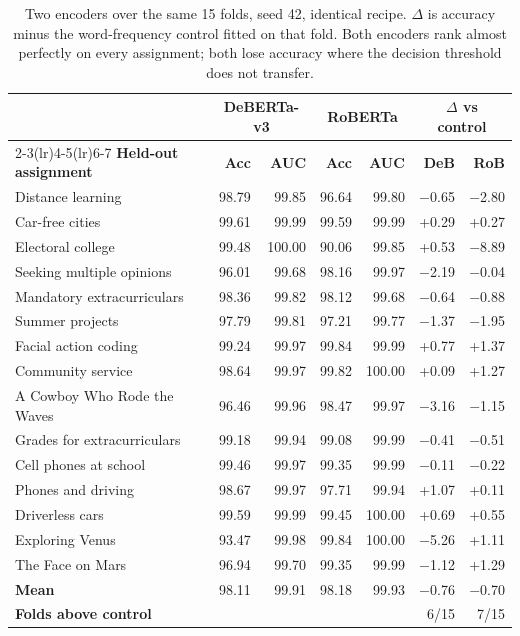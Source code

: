 \documentclass[11pt,a4paper]{article}
\begin{document}
\begin{table}[tb]
\centering
\small
\caption{Two encoders over the same 15 folds, seed 42, identical recipe.
$\Delta$ is accuracy minus the word-frequency control fitted on that fold.
Both encoders rank almost perfectly on every assignment; both lose accuracy
where the decision threshold does not transfer.}
\label{tab:encoders}
\begin{tabular}{@{}lrrrrrr@{}}
\toprule
& \multicolumn{2}{c}{\textbf{DeBERTa-v3}} & \multicolumn{2}{c}{\textbf{RoBERTa}}
& \multicolumn{2}{c}{\textbf{$\Delta$ vs control}} \\
\cmidrule(lr){2-3}\cmidrule(lr){4-5}\cmidrule(lr){6-7}
\textbf{Held-out assignment} & \textbf{Acc} & \textbf{AUC} & \textbf{Acc}
& \textbf{AUC} & \textbf{DeB} & \textbf{RoB} \\
\midrule
Distance learning            & 98.79 & 99.85 & 96.64 & 99.80 & $-$0.65 & $-$2.80 \\
Car-free cities              & 99.61 & 99.99 & 99.59 & 99.99 & +0.29 & +0.27 \\
Electoral college            & 99.48 & 100.00 & 90.06 & 99.85 & +0.53 & $-$8.89 \\
Seeking multiple opinions    & 96.01 & 99.68 & 98.16 & 99.97 & $-$2.19 & $-$0.04 \\
Mandatory extracurriculars   & 98.36 & 99.82 & 98.12 & 99.68 & $-$0.64 & $-$0.88 \\
Summer projects              & 97.79 & 99.81 & 97.21 & 99.77 & $-$1.37 & $-$1.95 \\
Facial action coding         & 99.24 & 99.97 & 99.84 & 99.99 & +0.77 & +1.37 \\
Community service            & 98.64 & 99.97 & 99.82 & 100.00 & +0.09 & +1.27 \\
A Cowboy Who Rode the Waves  & 96.46 & 99.96 & 98.47 & 99.97 & $-$3.16 & $-$1.15 \\
Grades for extracurriculars  & 99.18 & 99.94 & 99.08 & 99.99 & $-$0.41 & $-$0.51 \\
Cell phones at school        & 99.46 & 99.97 & 99.35 & 99.99 & $-$0.11 & $-$0.22 \\
Phones and driving           & 98.67 & 99.97 & 97.71 & 99.94 & +1.07 & +0.11 \\
Driverless cars              & 99.59 & 99.99 & 99.45 & 100.00 & +0.69 & +0.55 \\
Exploring Venus              & 93.47 & 99.98 & 99.84 & 100.00 & $-$5.26 & +1.11 \\
The Face on Mars             & 96.94 & 99.70 & 99.35 & 99.99 & $-$1.12 & +1.29 \\
\midrule
\textbf{Mean}                & 98.11 & 99.91 & 98.18 & 99.93 & $-$0.76 & $-$0.70 \\
\textbf{Folds above control} &       &       &       &       & 6/15 & 7/15 \\
\bottomrule
\end{tabular}
\end{table}
\end{document}
